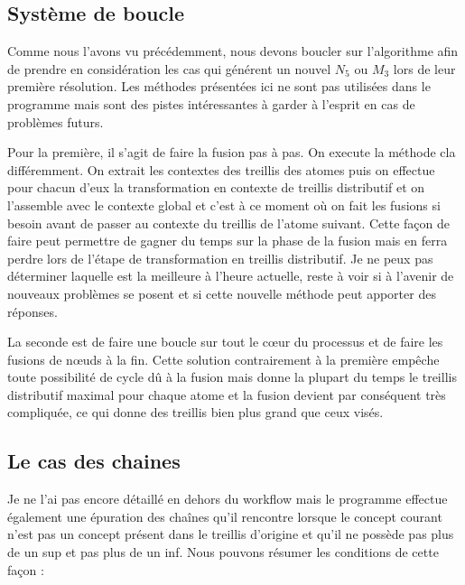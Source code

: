 \subsection{Système de boucle}

Comme nous l'avons vu précédemment, nous devons boucler sur l'algorithme afin de prendre en considération les cas qui générent un nouvel $N_5$ ou $M_3$ lors de leur première résolution. Les méthodes présentées ici ne sont pas utilisées dans le programme mais sont des pistes intéressantes à garder à l'esprit en cas de problèmes futurs.

\smallbreak

Pour la première, il s'agit de faire la fusion pas à pas. On execute la méthode cla différemment. On extrait les contextes des treillis des atomes puis on effectue pour chacun d'eux la transformation en contexte de treillis distributif et on l'assemble avec le contexte global et c'est à ce moment où on fait les fusions si besoin avant de passer au contexte du treillis de l'atome suivant. Cette façon de faire peut permettre de gagner du temps sur la phase de la fusion mais en ferra perdre lors de l'étape de transformation en treillis distributif. Je ne peux pas déterminer laquelle est la meilleure à l'heure actuelle, reste à voir si à l'avenir de nouveaux problèmes se posent et si cette nouvelle méthode peut apporter des réponses.

\smallbreak

La seconde est de faire une boucle sur tout le c\oe ur du processus et de faire les fusions de n\oe uds à la fin. Cette solution contrairement à la première empêche toute possibilité de cycle dû à la fusion mais donne la plupart du temps le treillis distributif maximal pour chaque atome et la fusion devient par conséquent très compliquée, ce qui donne des treillis bien plus grand que ceux visés.

\subsection{Le cas des chaines}

Je ne l'ai pas encore détaillé en dehors du workflow mais le programme effectue également une épuration des chaînes qu'il rencontre lorsque le concept courant n'est pas un concept présent dans le treillis d'origine et qu'il ne possède pas plus de un sup et pas plus de un inf. Nous pouvons résumer les conditions de cette façon :

